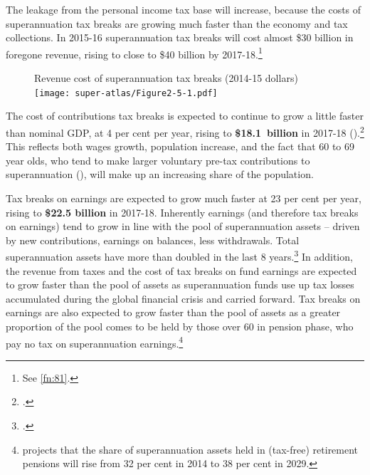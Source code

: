 The leakage from the personal income tax base will increase, because the costs of superannuation tax breaks are growing much faster than the economy and tax collections. 
In 2015-16 superannuation tax breaks will cost almost \$30 billion in foregone revenue, rising to close to \$40 billion by 2017-18.\footnote{See \cref{fn:81}.}

\begin{figure}
%
{Revenue cost of superannuation tax breaks (2014-15 dollars)}\label{fig:SUPER-2-5}
\texttt{[image: super-atlas/Figure2-5-1.pdf]}

\end{figure}

The cost of contributions tax breaks is expected to continue to grow a little faster than nominal GDP, at 4 per cent per year, rising to \textbf{\$18.1~billion} in 2017-18 ().\footcite[][4--14]{Treasury2015BudgetPapers201516}  
This reflects both wages growth, population increase, and the fact that 60 to 69 year olds, who tend to make larger voluntary pre-tax contributions to superannuation (), will make up an increasing share of the population. 

Tax breaks on earnings are expected to grow much faster at 23 per cent per year, rising to \textbf{\$22.5 billion} in 2017-18. Inherently earnings (and therefore tax breaks on earnings) tend to grow in line with the pool of superannuation assets – driven by new contributions, earnings on balances, less withdrawals. Total superannuation assets have more than doubled in the last 8 years.\footcite[Table~7]{APRA2014}  
In addition, the revenue from taxes and the cost of tax breaks on fund earnings are expected to grow faster than the pool of assets as superannuation funds use up tax losses accumulated during the global financial crisis and carried forward. Tax breaks on earnings are also expected to grow faster than the pool of assets as a greater proportion of the pool comes to be held by those over 60 in pension phase, who pay no tax on superannuation earnings.\footnote{\textcite[][23]{RiceWarner2015SubmissionTaxWhitePaper} projects that the share of superannuation assets held in (tax-free) retirement pensions will rise from 32 per cent in 2014 to 38 per cent in 2029.}  

